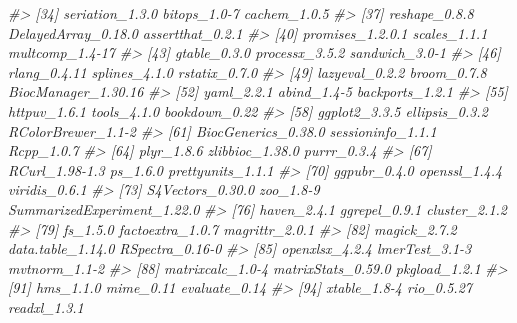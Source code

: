 \documentclass[]{article}
\newcommand{\hlcom}[1]{\textcolor[rgb]{0.502,0.502,0.502}{\textit{#1}}}%
\newenvironment{Shaded}{\begin{myshaded}}{\end{myshaded}}
\newcommand{\CommentTok}[1]{\hlcom{#1}}
\begin{document}
\begin{Shaded}
\begin{Highlighting}[]
\CommentTok{\#\textgreater{}  [34] seriation\_1.3.0             bitops\_1.0{-}7                cachem\_1.0.5               }
\CommentTok{\#\textgreater{}  [37] reshape\_0.8.8               DelayedArray\_0.18.0         assertthat\_0.2.1           }
\CommentTok{\#\textgreater{}  [40] promises\_1.2.0.1            scales\_1.1.1                multcomp\_1.4{-}17            }
\CommentTok{\#\textgreater{}  [43] gtable\_0.3.0                processx\_3.5.2              sandwich\_3.0{-}1             }
\CommentTok{\#\textgreater{}  [46] rlang\_0.4.11                splines\_4.1.0               rstatix\_0.7.0              }
\CommentTok{\#\textgreater{}  [49] lazyeval\_0.2.2              broom\_0.7.8                 BiocManager\_1.30.16        }
\CommentTok{\#\textgreater{}  [52] yaml\_2.2.1                  abind\_1.4{-}5                 backports\_1.2.1            }
\CommentTok{\#\textgreater{}  [55] httpuv\_1.6.1                tools\_4.1.0                 bookdown\_0.22              }
\CommentTok{\#\textgreater{}  [58] ggplot2\_3.3.5               ellipsis\_0.3.2              RColorBrewer\_1.1{-}2         }
\CommentTok{\#\textgreater{}  [61] BiocGenerics\_0.38.0         sessioninfo\_1.1.1           Rcpp\_1.0.7                 }
\CommentTok{\#\textgreater{}  [64] plyr\_1.8.6                  zlibbioc\_1.38.0             purrr\_0.3.4                }
\CommentTok{\#\textgreater{}  [67] RCurl\_1.98{-}1.3              ps\_1.6.0                    prettyunits\_1.1.1          }
\CommentTok{\#\textgreater{}  [70] ggpubr\_0.4.0                openssl\_1.4.4               viridis\_0.6.1              }
\CommentTok{\#\textgreater{}  [73] S4Vectors\_0.30.0            zoo\_1.8{-}9                   SummarizedExperiment\_1.22.0}
\CommentTok{\#\textgreater{}  [76] haven\_2.4.1                 ggrepel\_0.9.1               cluster\_2.1.2              }
\CommentTok{\#\textgreater{}  [79] fs\_1.5.0                    factoextra\_1.0.7            magrittr\_2.0.1             }
\CommentTok{\#\textgreater{}  [82] magick\_2.7.2                data.table\_1.14.0           RSpectra\_0.16{-}0            }
\CommentTok{\#\textgreater{}  [85] openxlsx\_4.2.4              lmerTest\_3.1{-}3              mvtnorm\_1.1{-}2              }
\CommentTok{\#\textgreater{}  [88] matrixcalc\_1.0{-}4            matrixStats\_0.59.0          pkgload\_1.2.1              }
\CommentTok{\#\textgreater{}  [91] hms\_1.1.0                   mime\_0.11                   evaluate\_0.14              }
\CommentTok{\#\textgreater{}  [94] xtable\_1.8{-}4                rio\_0.5.27                  readxl\_1.3.1               }

\end{Highlighting}
\end{Shaded}
\end{document}
